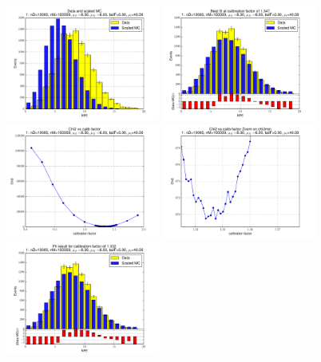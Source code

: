 
 \begin{figure}[htbp] \begin{center} 
\includegraphics[width=0.45\textwidth]{../FIGURES/01/FIG_Data_and_scaled_MC.pdf} 
\includegraphics[width=0.45\textwidth]{../FIGURES/01/FIG_Best_fit_at_calibration_factor_of_1_347.pdf} 
\includegraphics[width=0.45\textwidth]{../FIGURES/01/FIG_Chi2_vs_calib_factor.pdf} 
\includegraphics[width=0.45\textwidth]{../FIGURES/01/FIG_Chi2_vs_calib_factor_Zoom_on_chi2min.pdf} 
\includegraphics[width=0.45\textwidth]{../FIGURES/01/FIG_Fit_result_for_calibration_factor_of_1_332.pdf} 

\end{center}
\end{figure}
